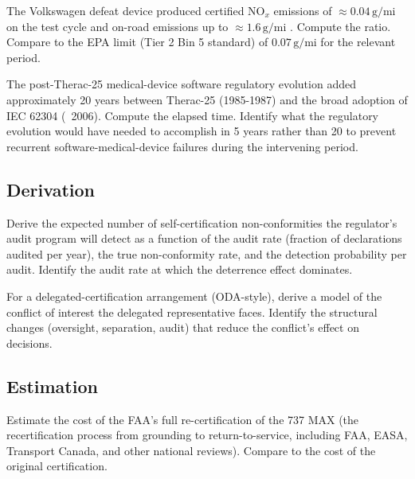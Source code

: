 \begin{exercise}
The Volkswagen defeat device produced certified NO$_x$ emissions of $\approx 0.04\,\text{g/mi}$ on the test cycle and on-road emissions up to $\approx 1.6\,\text{g/mi}$ \cite{acc:epa-vw-nov-2015}. Compute the ratio. Compare to the EPA limit (Tier 2 Bin 5 standard) of $0.07\,\text{g/mi}$ for the relevant period.
\end{exercise}

\begin{exercise}
The post-Therac-25 medical-device software regulatory evolution added approximately 20 years between Therac-25 (1985-1987) and the broad adoption of IEC 62304 (~2006). Compute the elapsed time. Identify what the regulatory evolution would have needed to accomplish in 5 years rather than 20 to prevent recurrent software-medical-device failures during the intervening period.
\end{exercise}

\subsection*{Derivation}

\begin{exercise}
Derive the expected number of self-certification non-conformities the regulator's audit program will detect as a function of the audit rate (fraction of declarations audited per year), the true non-conformity rate, and the detection probability per audit. Identify the audit rate at which the deterrence effect dominates.
\end{exercise}

\begin{exercise}
For a delegated-certification arrangement (ODA-style), derive a model of the conflict of interest the delegated representative faces. Identify the structural changes (oversight, separation, audit) that reduce the conflict's effect on decisions.
\end{exercise}

\subsection*{Estimation}

\begin{exercise}
Estimate the cost of the FAA's full re-certification of the 737 MAX (the recertification process from grounding to return-to-service, including FAA, EASA, Transport Canada, and other national reviews). Compare to the cost of the original certification.
\end{exercise}

